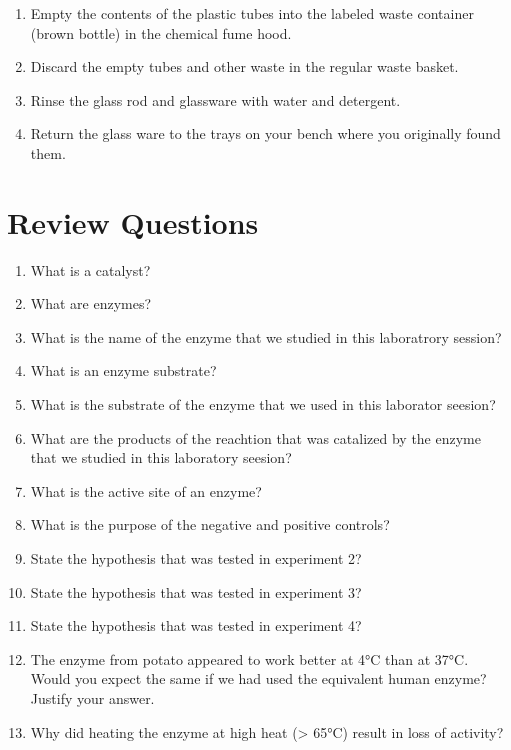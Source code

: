 \begin{enumerate}
\def\labelenumi{\arabic{enumi}.}
\tightlist
\item
  Empty the contents of the plastic tubes into the labeled waste
  container (brown bottle) in the chemical fume hood.
\item
  Discard the empty tubes and other waste in the regular waste basket.
\item
  Rinse the glass rod and glassware with water and detergent.
\item
  Return the glass ware to the trays on your bench where you originally
  found them.
\end{enumerate}

\section{Review Questions}\label{review-questions-4}

\begin{enumerate}
\def\labelenumi{\arabic{enumi}.}
\tightlist
\item
  What is a catalyst?
\item
  What are enzymes?
\item
  What is the name of the enzyme that we studied in this laboratrory
  session?
\item
  What is an enzyme substrate?
\item
  What is the substrate of the enzyme that we used in this laborator
  seesion?
\item
  What are the products of the reachtion that was catalized by the
  enzyme that we studied in this laboratory seesion?
\item
  What is the active site of an enzyme?
\item
  What is the purpose of the negative and positive controls?
\item
  State the hypothesis that was tested in experiment 2?
\item
  State the hypothesis that was tested in experiment 3?
\item
  State the hypothesis that was tested in experiment 4?
\item
  The enzyme from potato appeared to work better at 4°C than at 37°C.
  Would you expect the same if we had used the equivalent human enzyme?
  Justify your answer.
\item
  Why did heating the enzyme at high heat (\textgreater{} 65°C) result
  in loss of activity?
\end{enumerate}
